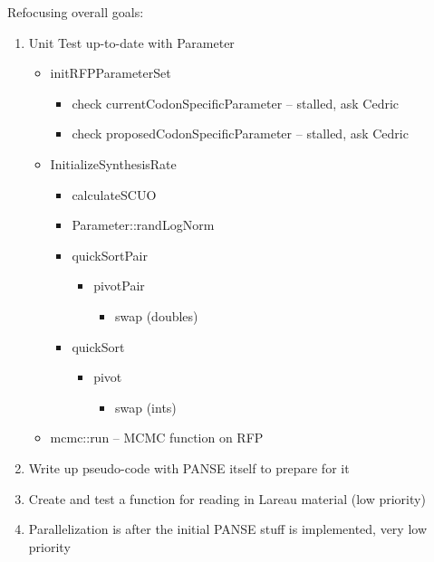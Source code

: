 \documentclass[12pt,hyperref]{labbook}
\begin{document}
Refocusing overall goals:
\begin{enumerate}
    \item Unit Test up-to-date with Parameter
    \begin{itemize}
        \item{initRFPParameterSet}
        \begin{itemize}
            \item check currentCodonSpecificParameter -- stalled, ask Cedric
            \item check proposedCodonSpecificParameter -- stalled, ask Cedric
        \end{itemize}
        \item{InitializeSynthesisRate}
        \begin{itemize}
            \item calculateSCUO
            \item Parameter::randLogNorm
            \item quickSortPair
            \begin{itemize}
                \item pivotPair
                \begin{itemize}
                    \item swap (doubles)
                \end{itemize}
            \end{itemize}
            \item quickSort
            \begin{itemize}
                \item pivot
                \begin{itemize}
                    \item swap (ints)
                \end{itemize}
            \end{itemize}
        \end{itemize}
        \item mcmc::run -- MCMC function on RFP
    \end{itemize}
    \item Write up pseudo-code with PANSE itself to prepare for it
    \item Create and test a function for reading in Lareau material (low priority)
    \item Parallelization is after the initial PANSE stuff is implemented, very low priority
\end{enumerate}
\end{document}
